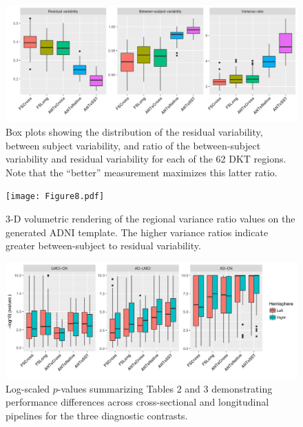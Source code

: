 \documentclass[]{article}
\begin{document}
\newpage

\begin{figure}[!h]
\centering
\includegraphics[width=\textwidth]{Figure7.pdf}
\caption{Box plots showing the distribution of the residual variability,
between subject variability, and ratio of the between-subject variability and
residual variability for each of the 62 DKT regions.  Note that the
``better'' measurement maximizes this latter ratio.}
\label{fig:variance_boxplots}
\end{figure}

\newpage

\begin{figure}[!h]
\centering
\texttt{[image: Figure8.pdf]}
\caption{3-D volumetric rendering of the regional variance ratio values on the generated ADNI template.
The higher variance ratios indicate greater between-subject to residual variability.}
\label{fig:brain_variance}
\end{figure}

\newpage

\begin{figure}[ht!]
\centering
\includegraphics[width=1.0\textwidth]{Figure9.pdf}
\caption{
Log-scaled $p$-values summarizing Tables 2 and 3 demonstrating performance differences
across cross-sectional and longitudinal pipelines for the three diagnostic contrasts.
}
\label{fig:logpvalues}
\end{figure}

\newpage



\newpage



\newpage



\newpage
\end{document}
